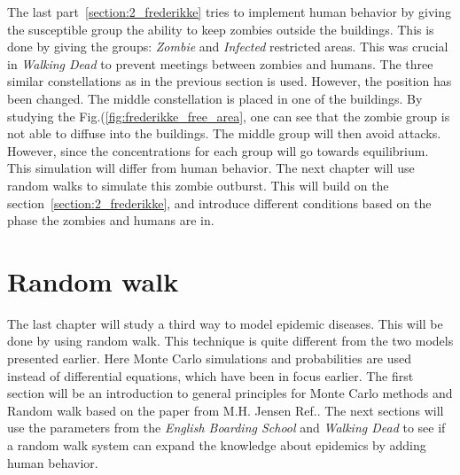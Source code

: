 \documentclass[%
twoside,                 %
final,                   %
chapterprefix=true,      %
open=right               %
10pt]{book}
\begin{document}
\vspace{3mm}




\vspace{3mm}


The last part~\ref{section:2_frederikke} tries to implement human behavior by giving the susceptible group the ability to keep zombies outside the buildings. This is done by giving the groups: \emph{Zombie} and \emph{Infected} restricted areas. This was crucial in \emph{Walking Dead} to prevent meetings between zombies and humans. The three similar constellations as in the previous section is used. However, the position has been changed. The middle constellation is placed in one of the buildings. By studying the Fig.(\ref{fig:frederikke_free_area}, one can see that the zombie group is not able to diffuse into the buildings. The middle group will then avoid attacks. However, since the concentrations for each group will go towards equilibrium. This simulation will differ from human behavior. The next chapter will use random walks to simulate this zombie outburst. This will build on the section~\ref{section:2_frederikke}, and introduce different conditions based on the phase the zombies and humans are in. 



\chapter{Random walk}
\label{section:Random_walk}
The last chapter will study a third way to model epidemic diseases. This will be done by using random walk. This technique is quite different from the two models presented earlier. Here Monte Carlo simulations and probabilities are used instead of differential equations, which have been in focus earlier. The first section will be an introduction to general principles for Monte Carlo methods and Random walk based on the paper from M.H. Jensen Ref.\cite{hjorth2011computational}. The next sections will use the parameters from the \emph{English Boarding School} and \emph{Walking Dead} to see if a random walk system can expand the knowledge about epidemics by adding human behavior. 
\end{document}

